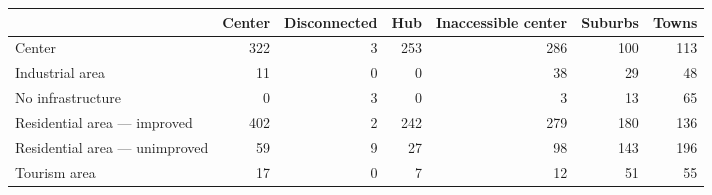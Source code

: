 \begin{tabular}{lrrrrrr}
\toprule
{} &  Center &  Disconnected &  Hub &  Inaccessible center &  Suburbs &  Towns \\
\midrule
Center                          &     322 &             3 &  253 &                  286 &      100 &    113 \\
Industrial area                 &      11 &             0 &    0 &                   38 &       29 &     48 \\
No infrastructure               &       0 &             3 &    0 &                    3 &       13 &     65 \\
Residential area --- improved   &     402 &             2 &  242 &                  279 &      180 &    136 \\
Residential area --- unimproved &      59 &             9 &   27 &                   98 &      143 &    196 \\
Tourism area                    &      17 &             0 &    7 &                   12 &       51 &     55 \\
\bottomrule
\end{tabular}
